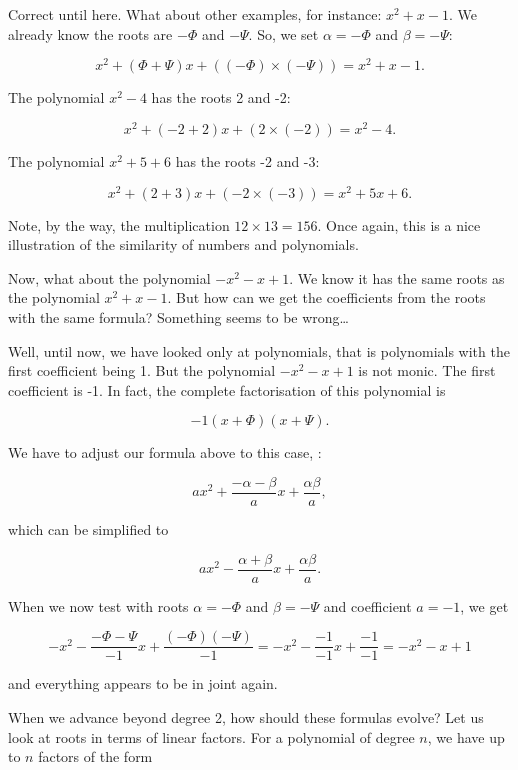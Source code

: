 \documentclass[tikz]{scrreprt}
\begin{document}
Correct until here.
What about other examples, for instance: 
$x^2 + x - 1$.
We already know the roots are $-\Phi$ and $-\Psi$.
So, we set $\alpha=-\Phi$ and $\beta=-\Psi$:

\begin{equation}
x^2 + (\Phi+\Psi)x + ((-\Phi)\times(-\Psi)) = x^2 + x - 1.
\end{equation}

The polynomial $x^2 - 4$ has the roots 2 and -2:

\begin{equation}
x^2 + (-2+2)x + (2\times(-2)) = x^2 - 4.
\end{equation}

The polynomial $x^2 + 5 + 6$ has the roots
-2 and -3:

\begin{equation}
x^2 + (2+3)x + (-2\times(-3)) = x^2 + 5x + 6.
\end{equation}

Note, by the way, the multiplication $12\times 13 = 156$.
Once again, this is a nice illustration of the similarity 
of numbers and polynomials.

Now, what about the polynomial
$-x^2 - x + 1$.
We know it has the same roots as
the polynomial
$x^2 + x - 1$.
But how can we get the coefficients from the roots
with the same formula? Something seems to be wrong\dots

Well, until now, we have looked only at 
polynomials, that is polynomials with the first coefficient
being 1. But the polynomial $-x^2 - x + 1$ is not monic.
The first coefficient is -1. In fact, the complete
factorisation of this polynomial is

\[
-1(x+\Phi)(x+\Psi).
\]

We have to adjust our formula above to this case,
\ie:

\[
ax^2 + \frac{-\alpha-\beta}{a}x + \frac{\alpha\beta}{a},
\]

which can be simplified to

\[
ax^2 - \frac{\alpha+\beta}{a}x + \frac{\alpha\beta}{a}.
\]

When we now test with roots $\alpha=-\Phi$ and $\beta=-\Psi$
and coefficient $a=-1$,
we get

\[
-x^2 - \frac{-\Phi-\Psi}{-1}x + \frac{(-\Phi)(-\Psi)}{-1} = 
-x^2 - \frac{-1}{-1}x + \frac{-1}{-1} =
-x^2 - x + 1
\]

and everything appears to be in joint again.

When we advance beyond degree 2,
how should these formulas evolve?
Let us look at roots in terms of linear factors.
For a polynomial of degree $n$, we have up to $n$ factors
of the form
\end{document}
